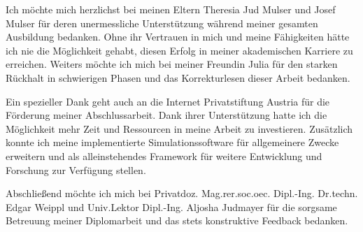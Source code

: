 Ich möchte mich herzlichst bei meinen Eltern Theresia Jud Mulser und Josef Mulser für deren unermessliche Unterstützung während meiner gesamten Ausbildung bedanken.
Ohne ihr Vertrauen in mich und meine Fähigkeiten hätte ich nie die Möglichkeit gehabt, diesen Erfolg in meiner akademischen Karriere zu erreichen.
Weiters möchte ich mich bei meiner Freundin Julia für den starken Rückhalt in schwierigen Phasen und das Korrekturlesen dieser Arbeit bedanken.

\bigskip

Ein spezieller Dank geht auch an die Internet Privatstiftung Austria für die Förderung meiner Abschlussarbeit.
Dank ihrer Unterstützung hatte ich die Möglichkeit mehr Zeit und Ressourcen in meine Arbeit zu investieren.
Zusätzlich konnte ich meine implementierte Simulationssoftware für allgemeinere Zwecke erweitern und als alleinstehendes Framework für weitere Entwicklung und Forschung zur Verfügung stellen.

Abschließend möchte ich mich bei Privatdoz. Mag.rer.soc.oec. Dipl.-Ing. Dr.techn. Edgar Weippl und Univ.Lektor Dipl.-Ing. Aljosha Judmayer für die sorgsame Betreuung meiner Diplomarbeit und das stets konstruktive Feedback bedanken.

